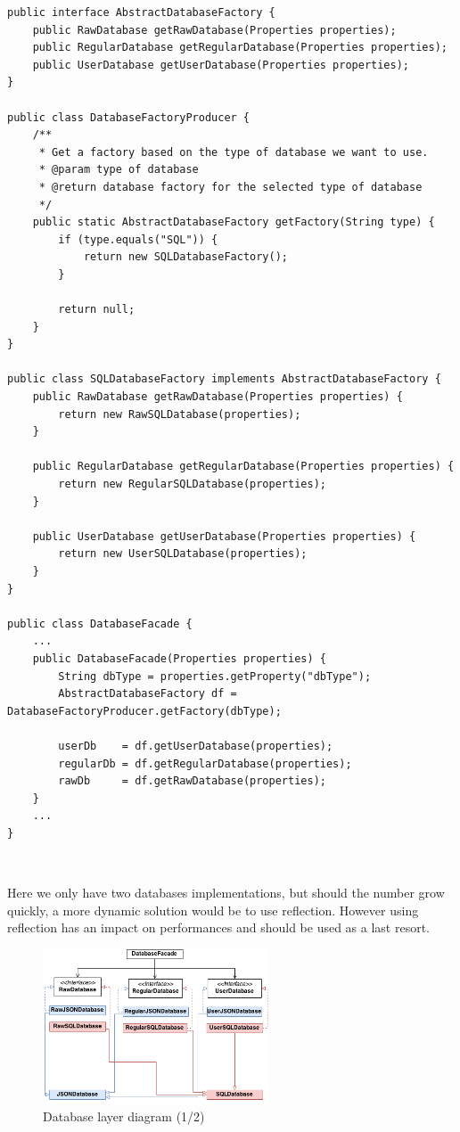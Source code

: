 \begin{lstlisting}
public interface AbstractDatabaseFactory {
	public RawDatabase getRawDatabase(Properties properties);
	public RegularDatabase getRegularDatabase(Properties properties);
	public UserDatabase getUserDatabase(Properties properties);
}

public class DatabaseFactoryProducer {
	/**
	 * Get a factory based on the type of database we want to use.
	 * @param type of database
	 * @return database factory for the selected type of database
	 */
	public static AbstractDatabaseFactory getFactory(String type) {
		if (type.equals("SQL")) {
			return new SQLDatabaseFactory();
		}
		
		return null;
	}
}

public class SQLDatabaseFactory implements AbstractDatabaseFactory {
	public RawDatabase getRawDatabase(Properties properties) {
		return new RawSQLDatabase(properties);
	}

	public RegularDatabase getRegularDatabase(Properties properties) {
		return new RegularSQLDatabase(properties);
	}

	public UserDatabase getUserDatabase(Properties properties) {
		return new UserSQLDatabase(properties);
	}
}

public class DatabaseFacade {
    ...
    public DatabaseFacade(Properties properties) {
    	String dbType = properties.getProperty("dbType");
    	AbstractDatabaseFactory df = DatabaseFactoryProducer.getFactory(dbType);
    	
    	userDb    = df.getUserDatabase(properties);
    	regularDb = df.getRegularDatabase(properties);
    	rawDb     = df.getRawDatabase(properties);
    }
    ...
}
\end{lstlisting}
\

Here we only have two databases implementations, but should the number grow
quickly, a more dynamic solution would be to use reflection. However using
reflection has an impact on performances and should be used as a last resort.

\begin{figure}[h!]
    \caption{Database layer diagram (1/2)}
    \centering
    \includegraphics[width=0.6\textwidth]{images/db_diag.png}
\end{figure}

